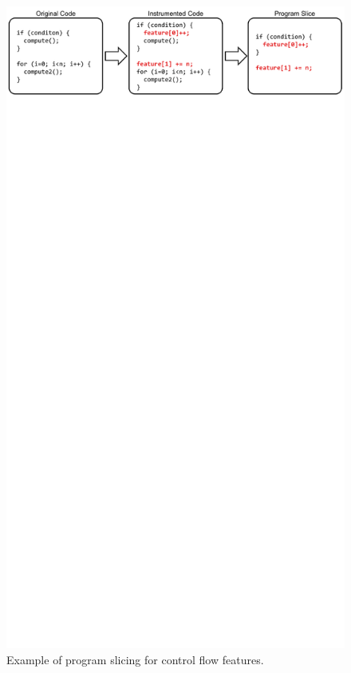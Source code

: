 \begin{figure}
  \begin{center}
    \includegraphics{exec_time_prediction/figs/code_transformations.pdf}
    \caption{Example of program slicing for control flow features.}
    \label{fig:exec_time_prediction.prediction.code_transformations}
  \end{center}
\end{figure}

